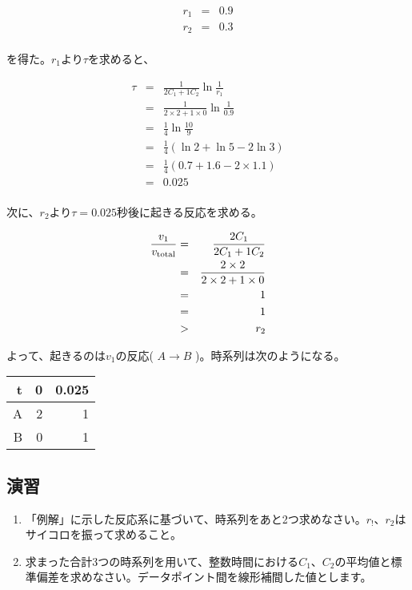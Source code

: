 \begin{eqnarray*}
r_1 & = & 0.9\\
r_2 & = & 0.3\\
\end{eqnarray*}

を得た。\(r_1\)より\(\tau\)を求めると、

\begin{eqnarray*}
\tau & = & \frac{1}{2 C_1 + 1 C_2} \ln \frac{1}{r_1}\\
     & = & \frac{1}{2 \times 2 + 1 \times 0} \ln \frac{1}{0.9}\\
     & = & \frac{1}{4} \ln \frac{10}{9}\\
     & = & \frac{1}{4} ( \ln 2 + \ln 5 - 2 \ln 3 ) \\
     & = & \frac{1}{4} ( 0.7 + 1.6 - 2 \times 1.1 )\\
     & = & 0.025\\
\end{eqnarray*}

次に、\(r_2\)より\(\tau = 0.025\)秒後に起きる反応を求める。

\begin{eqnarray*}
\frac{v_1}{v_{\rm total}} & = & \frac{2 C_1}{2 C_1 + 1 C_2} \\
                        & = & \frac{2 \times 2}{2 \times 2 + 1 \times 0} \\
                        & = & 1\\
                        & = & 1\\
                        & > & r_2
\end{eqnarray*}

よって、起きるのは\(v_1\)の反応( \(A \longrightarrow B\) )。時系列は次のようになる。\\

\begin{tabular}{r||r|r}
\hline
t & 0 & 0.025\\
\hline
A & 2 & 1 \\
B & 0 & 1 \\
\hline
\end{tabular}


\subsection{演習}
\begin{enumerate}
\item 「例解」に示した反応系に基づいて、時系列をあと2つ求めなさい。\(r_!\)、\(r_2\)はサイコロを振って求めること。
\item 求まった合計3つの時系列を用いて、整数時間における\(C_1\)、\(C_2\)の平均値と標準偏差を求めなさい。データポイント間を線形補間した値とします。
\end{enumerate}


